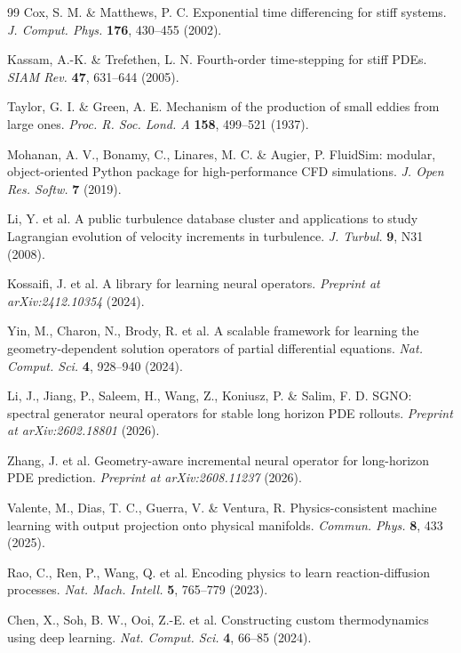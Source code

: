\documentclass[11pt,a4paper]{article}
\begin{document}
\begin{thebibliography}{99}
 Cox, S. M. \& Matthews, P. C. Exponential time differencing for stiff systems. \emph{J. Comput. Phys.} \textbf{176}, 430--455 (2002).

 Kassam, A.-K. \& Trefethen, L. N. Fourth-order time-stepping for stiff PDEs. \emph{SIAM Rev.} \textbf{47}, 631--644 (2005).

 Taylor, G. I. \& Green, A. E. Mechanism of the production of small eddies from large ones. \emph{Proc. R. Soc. Lond. A} \textbf{158}, 499--521 (1937).

 Mohanan, A. V., Bonamy, C., Linares, M. C. \& Augier, P. FluidSim: modular, object-oriented Python package for high-performance CFD simulations. \emph{J. Open Res. Softw.} \textbf{7} (2019).

 Li, Y. et al. A public turbulence database cluster and applications to study Lagrangian evolution of velocity increments in turbulence. \emph{J. Turbul.} \textbf{9}, N31 (2008).

 Kossaifi, J. et al. A library for learning neural operators. \emph{Preprint at arXiv:2412.10354} (2024).

 Yin, M., Charon, N., Brody, R. et al. A scalable framework for learning the geometry-dependent solution operators of partial differential equations. \emph{Nat. Comput. Sci.} \textbf{4}, 928--940 (2024).

 Li, J., Jiang, P., Saleem, H., Wang, Z., Koniusz, P. \& Salim, F. D. SGNO: spectral generator neural operators for stable long horizon PDE rollouts. \emph{Preprint at arXiv:2602.18801} (2026).

 Zhang, J. et al. Geometry-aware incremental neural operator for long-horizon PDE prediction. \emph{Preprint at arXiv:2608.11237} (2026).

 Valente, M., Dias, T. C., Guerra, V. \& Ventura, R. Physics-consistent machine learning with output projection onto physical manifolds. \emph{Commun. Phys.} \textbf{8}, 433 (2025).

 Rao, C., Ren, P., Wang, Q. et al. Encoding physics to learn reaction-diffusion processes. \emph{Nat. Mach. Intell.} \textbf{5}, 765--779 (2023).

 Chen, X., Soh, B. W., Ooi, Z.-E. et al. Constructing custom thermodynamics using deep learning. \emph{Nat. Comput. Sci.} \textbf{4}, 66--85 (2024).


\end{thebibliography}
\end{document}
